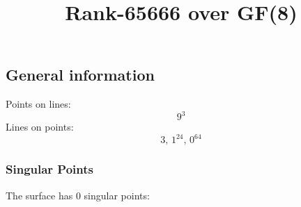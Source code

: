 \documentclass{article}
\newcommand\setTBstruts{\def\T{\rule{0pt}{2.6ex}}%
\def\B{\rule[-1.2ex]{0pt}{0pt}}}
\begin{document}
 
\setTBstruts



{\allowdisplaybreaks%






\title{Rank-65666 over GF(8)}
\author{}%
\maketitle%
%
{}



\subsection*{General information}
Points on lines:
$$
9^3$$
Lines on points:
$$
3,\,1^{24},\,0^{64}$$
\subsubsection*{Singular Points}
The surface has 0 singular points:\\
\begin{align*}
\end{align*}
}
\end{document}

